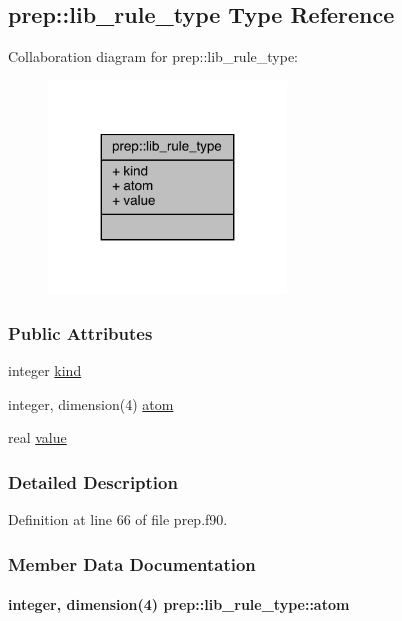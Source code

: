 \hypertarget{structprep_1_1lib__rule__type}{\subsection{prep\-:\-:lib\-\_\-rule\-\_\-type Type Reference}
\label{structprep_1_1lib__rule__type}
}


Collaboration diagram for prep\-:\-:lib\-\_\-rule\-\_\-type\-:
\nopagebreak
\begin{figure}[H]
\begin{center}
\leavevmode
\includegraphics[width=179pt]{structprep_1_1lib__rule__type__coll__graph}
\end{center}
\end{figure}
\subsubsection*{Public Attributes}
\begin{DoxyCompactItemize}
\item 
integer \hyperlink{structprep_1_1lib__rule__type_ae971ce34e2a5ae364117a1bba8c5c1e6}{kind}
\item 
integer, dimension(4) \hyperlink{structprep_1_1lib__rule__type_a44597e179e6c883e04ea309e72011ccd}{atom}
\item 
real \hyperlink{structprep_1_1lib__rule__type_a6777057a9b54bda281bef26856e1f443}{value}
\end{DoxyCompactItemize}


\subsubsection{Detailed Description}


Definition at line 66 of file prep.\-f90.



\subsubsection{Member Data Documentation}
\hypertarget{structprep_1_1lib__rule__type_a44597e179e6c883e04ea309e72011ccd}{
\paragraph[{atom}]{\setlength{\rightskip}{0pt plus 5cm}integer, dimension(4) prep\-::lib\-\_\-rule\-\_\-type\-::atom}}\label{structprep_1_1lib__rule__type_a44597e179e6c883e04ea309e72011ccd}


